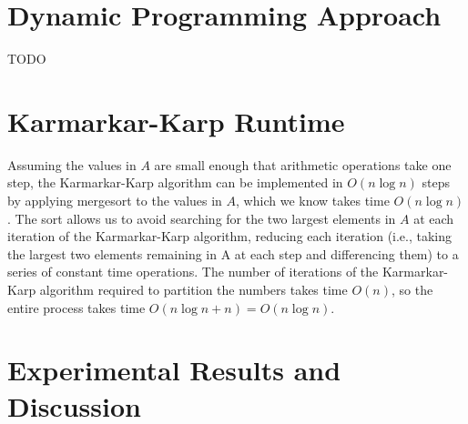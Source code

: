 \documentclass[solution, letterpaper]{cs121}
\begin{document}

\section*{Dynamic Programming Approach}
TODO


\section*{Karmarkar-Karp Runtime}
\hspace{4mm} Assuming the values in $A$ are small enough that arithmetic operations take one step, the Karmarkar-Karp algorithm can be implemented in $O(n \log n)$ steps by applying mergesort to the values in $A$, which we know takes time $O(n \log n)$. The sort allows us to avoid searching for the two largest elements in $A$ at each iteration of the Karmarkar-Karp algorithm, reducing each iteration (i.e., taking the largest two elements remaining in A at each step and differencing them) to a series of constant time operations. The number of iterations of the Karmarkar-Karp algorithm required to partition the numbers takes time $O(n)$, so the entire process takes time $O(n \log n + n) = O(n \log n)$.


\section*{Experimental Results and Discussion}
\end{document}
